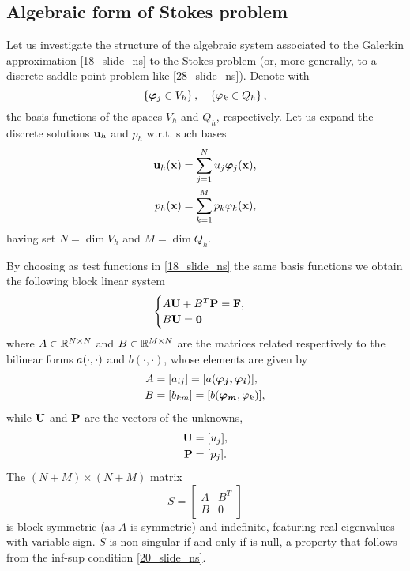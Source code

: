 \subsection*{Algebraic form of Stokes problem}
Let us investigate the structure of the algebraic system associated to the Galerkin approximation \eqref{18_slide_ns} to the Stokes problem (or, more generally, to a discrete saddle-point problem like \eqref{28_slide_ns}). Denote with 
\[
    \left\{ \bm{\phi}_j \in V_h \right\}, \quad \left\{ \oldphi_k \in Q_h \right\},
\]
the basis functions of the spaces \(V_h\) and \(Q_h\), respectively. Let us expand the discrete solutions \(\textbf{u}_h\) and \(p_h\) w.r.t. such bases 
\begin{equation}
    \begin{aligned}
        \uvec_h(\xvec) &= \sum_{j=1}^{N} u_j\bm{\phi}_j(\xvec), \\
        p_h(\xvec) &= \sum_{k=1}^{M} p_k\oldphi_k(\xvec),
        \label{46_slide_ns}
    \end{aligned}
\end{equation}
having set \(N = \dim V_h\) and \(M = \dim Q_h\).

By choosing as test functions in \eqref{18_slide_ns} the same basis functions we obtain the following block linear system 
\begin{equation}
    \begin{cases}
        A\textbf{U} + B^T \textbf{P} = \textbf{F}, \\
        B\textbf{U} = \textbf{0}
    \end{cases}
    \label{47_slide_ns}
\end{equation}
where \(A \in \mathbb{R}^{N\times N}\) and \(B \in \mathbb{R}^{M \times N}\) are the matrices related respectively to the bilinear forms \(a(\cdot, \cdot)\) and \(b(\cdot, \cdot)\), whose elements are given by 
\begin{align*}
    A &= [a_{ij}] = [a(\bm{\phi_j, \phi_i})], \\
    B &= [b_{km}] = [b(\bm{\phi_m}, \oldphi_k)],
\end{align*}
while \(\textbf{U}\) and \(\textbf{P}\) are the vectors of the unknowns, 
\begin{align*}
    \textbf{U} &= [u_j], \\
    \textbf{P} &= [p_j].
\end{align*}
The \((N+M) \times (N+M)\) matrix 
\begin{equation}
    S = \left[ \begin{matrix}
        A & B^T \\ B & 0
    \end{matrix} \right]
    \label{48_slide_ns}
\end{equation}
is block-symmetric (as \(A\) is symmetric) and indefinite, featuring real eigenvalues with variable sign. \(S\) is non-singular if and only if is null, a property that follows from the inf-sup condition \eqref{20_slide_ns}.

